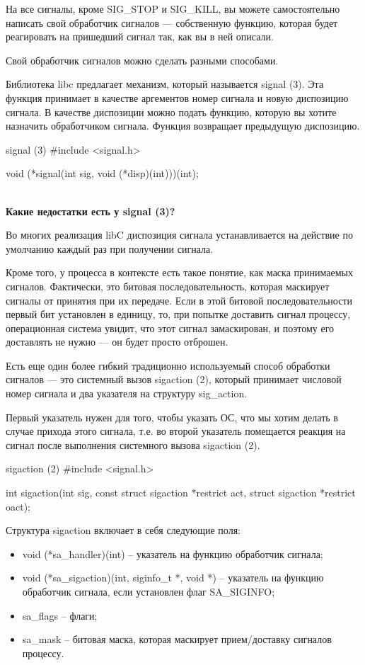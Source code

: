 На все сигналы, кроме SIG\_STOP и SIG\_KILL, вы можете самостоятельно написать свой обработчик сигналов --- собственную функцию, которая будет реагировать на пришедший сигнал так, как вы в ней описали.

Свой обработчик сигналов можно сделать разными способами.

Библиотека libc предлагает механизм, который называется signal (3). Эта функция принимает в качестве аргементов номер сигнала и новую диспозицию сигнала. В качестве диспозиции можно подать функцию, которую вы хотите назначить обработчиком сигнала. Функция возвращает предыдущую диспозицию.

\begin{CCode}{signal (3)}
	#include <signal.h>

    void (*signal(int sig, void (*disp)(int)))(int); \end{CCode}
~\\[0.5cm]

\textbf{Какие недостатки есть у signal (3)?}

Во многих реализация libC диспозиция сигнала устанавливается на действие по умолчанию каждый раз при получении сигнала.

Кроме того, у процесса в контексте есть такое понятие, как маска принимаемых сигналов. Фактически, это битовая последовательность, которая маскирует сигналы от принятия при их передаче. Если в этой битовой последовательности первый бит установлен в единицу, то, при попытке доставить сигнал процессу, операционная система увидит, что этот сигнал замаскирован, и поэтому его доставлять не нужно --- он будет просто отброшен.

Есть еще один более гибкий традиционно используемый способ обработки сигналов --- это системный вызов sigaction (2), который принимает числовой номер сигнала и два указателя на структуру sig\_action.

Первый указатель нужен для того, чтобы указать ОС, что мы хотим делать в случае прихода этого сигнала, т.е. во второй указатель помещается реакция на сигнал после выполнения системного вызова sigaction (2).

\begin{CCode}{sigaction (2)}
	#include <signal.h>

     int sigaction(int sig, const struct sigaction *restrict act,
         struct sigaction *restrict oact);  \end{CCode}

Структура sigaction включает в себя следующие поля:

\begin{itemize}
	\item void (*sa\_handler)(int) -- указатель на функцию обработчик сигнала;
	\item void (*sa\_sigaction)(int, siginfo\_t *, void *) -- указатель на функцию обработчик сигнала, если установлен флаг SA\_SIGINFO;
	\item sa\_flags -- флаги;
	\item sa\_mask -- битовая маска, которая маскирует прием/доставку сигналов процессу.
\end{itemize}
